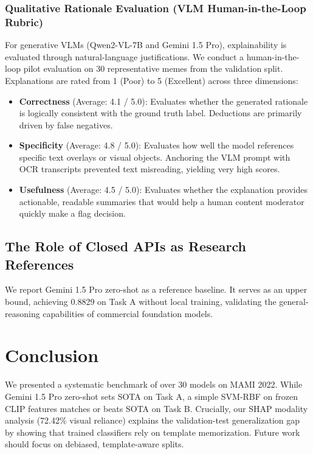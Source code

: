 \documentclass[11pt]{article}
\begin{document}
\subsubsection{Qualitative Rationale Evaluation (VLM Human-in-the-Loop Rubric)}
For generative VLMs (Qwen2-VL-7B and Gemini 1.5 Pro), explainability is evaluated through natural-language justifications. We conduct a human-in-the-loop pilot evaluation on 30 representative memes from the validation split. Explanations are rated from 1 (Poor) to 5 (Excellent) across three dimensions:
\begin{itemize}
    \item \textbf{Correctness} (Average: 4.1 / 5.0): Evaluates whether the generated rationale is logically consistent with the ground truth label. Deductions are primarily driven by false negatives.
    \item \textbf{Specificity} (Average: 4.8 / 5.0): Evaluates how well the model references specific text overlays or visual objects. Anchoring the VLM prompt with OCR transcripts prevented text misreading, yielding very high scores.
    \item \textbf{Usefulness} (Average: 4.5 / 5.0): Evaluates whether the explanation provides actionable, readable summaries that would help a human content moderator quickly make a flag decision.
\end{itemize}

\subsection{The Role of Closed APIs as Research References}
We report Gemini 1.5 Pro zero-shot as a reference baseline. It serves as an upper bound, achieving 0.8829 on Task A without local training, validating the general-reasoning capabilities of commercial foundation models.

\section{Conclusion}
\label{sec:conclusion}
We presented a systematic benchmark of over 30 models on MAMI 2022. While Gemini 1.5 Pro zero-shot sets SOTA on Task A, a simple SVM-RBF on frozen CLIP features matches or beats SOTA on Task B. Crucially, our SHAP modality analysis (72.42\% visual reliance) explains the validation-test generalization gap by showing that trained classifiers rely on template memorization. Future work should focus on debiased, template-aware splits.



\end{document}
